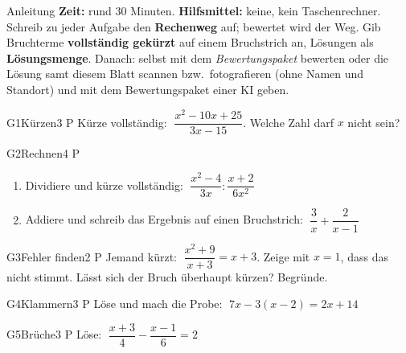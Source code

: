 \documentclass[11pt]{article}
\begin{document}

\begin{lpinfo}{Anleitung}
\textbf{Zeit:} rund 30 Minuten. \textbf{Hilfsmittel:} keine, kein Taschenrechner.
Schreib zu jeder Aufgabe den \textbf{Rechenweg} auf; bewertet wird der Weg. Gib Bruchterme \textbf{vollständig gekürzt} auf einem Bruchstrich an,
Lösungen als \textbf{Lösungsmenge}.
Danach: selbst mit dem \emph{Bewertungspaket} bewerten oder die Lösung samt diesem Blatt scannen bzw.\ fotografieren
(ohne Namen und Standort) und mit dem Bewertungspaket einer KI geben.
\end{lpinfo}


\begin{lpaufgabe}{G1}{Kürzen}{3 P}
Kürze vollständig: $\;\dfrac{x^2 - 10x + 25}{3x - 15}$. Welche Zahl darf $x$ nicht sein?
\end{lpaufgabe}

\begin{lpaufgabe}{G2}{Rechnen}{4 P}
\begin{enumerate}[label=(\alph*),leftmargin=*,itemsep=4pt]
\item Dividiere und kürze vollständig: $\;\dfrac{x^2 - 4}{3x} : \dfrac{x + 2}{6x^2}$
\item Addiere und schreib das Ergebnis auf einen Bruchstrich: $\;\dfrac{3}{x} + \dfrac{2}{x - 1}$
\end{enumerate}
\end{lpaufgabe}

\begin{lpaufgabe}{G3}{Fehler finden}{2 P}
Jemand kürzt: $\;\dfrac{x^2 + 9}{x + 3} = x + 3$. Zeige mit $x = 1$, dass das nicht stimmt.
Lässt sich der Bruch überhaupt kürzen? Begründe.
\end{lpaufgabe}


\begin{lpaufgabe}{G4}{Klammern}{3 P}
Löse und mach die Probe: $\;7x - 3(x - 2) = 2x + 14$
\end{lpaufgabe}

\begin{lpaufgabe}{G5}{Brüche}{3 P}
Löse: $\;\dfrac{x + 3}{4} - \dfrac{x - 1}{6} = 2$
\end{lpaufgabe}
\end{document}
